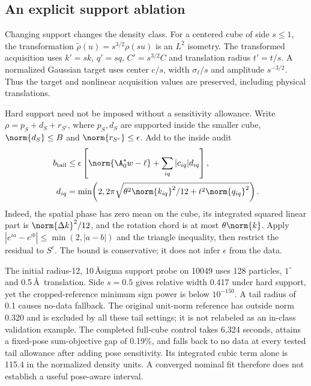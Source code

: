\subsection{An explicit support ablation}
Changing support changes the density class. For a centered cube of side
$s\le1$, the transformation $\widetilde\rho(u)=s^{3/2}\rho(su)$ is an $L^2$
isometry. The transformed acquisition uses $k'=sk$, $q'=sq$, $C'=s^{3/2}C$
and translation radius $t'=t/s$. A normalized Gaussian target uses center
$c/s$, width $\sigma_\ell/s$ and amplitude $s^{-3/2}$. Thus the target and
nonlinear acquisition values are preserved, including physical translations.

Hard support need not be imposed without a sensitivity allowance. Write
$\rho=p_S+d_S+r_{S^c}$, where $p_S,d_S$ are supported inside the smaller cube,
$\norm{d_S}\le B$ and $\norm{r_{S^c}}\le\epsilon$. Add to the inside audit
\begin{align}
 b_{\rm tail}&\le\epsilon\left[\norm{\A_0^*w-\ell}
               +\sum_{iq}|c_{iq}|d_{iq}\right],\nonumber\\
 d_{iq}&=\min\!\left(2,2\pi\sqrt{
    \theta^2\norm{k_{iq}}^2/12+t^2\norm{q_{iq}}^2}\right).
\end{align}
Indeed, the spatial phase has zero mean on the cube, its integrated squared
linear part is $\norm{\Delta k}^2/12$, and the rotation chord is at most
$\theta\norm{k}$. Apply $|e^{ia}-e^{ib}|\le\min(2,|a-b|)$ and the triangle
inequality, then restrict the residual to $S^c$. The bound is conservative;
it does not infer $\epsilon$ from the data.

The initial radius-12, 10\,\AA\-sigma support probe on 10049 uses 128 particles,
$1^\circ$ and 0.5\,\AA\ translation. Side $s=0.5$ gives relative width 0.417
under hard support, yet the cropped-reference minimum sign power is below
$10^{-150}$. A tail radius of 0.1 causes no-data fallback. The original
unit-norm reference has outside norm 0.320 and is excluded by all these tail
settings; it is not relabeled as an in-class validation example. The completed
full-cube control takes 6,324 seconds, attains a fixed-pose sum-objective gap
of 0.19\%, and falls back to no data at every tested tail allowance after
adding pose sensitivity. Its integrated cubic term alone is 115.4 in the
normalized density units. A converged nominal fit therefore does not establish
a useful pose-aware interval.

